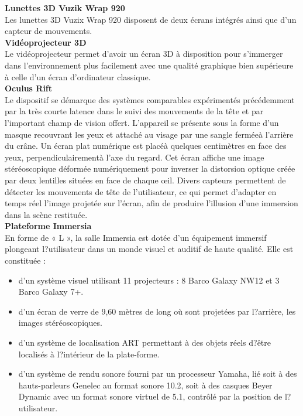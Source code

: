 \textbf{Lunettes 3D Vuzik Wrap 920}
\\

Les lunettes 3D Vuzix Wrap 920 disposent de deux écrans intégrés ainsi que d'un capteur de mouvements.
\\

\textbf{Vidéoprojecteur 3D}
\\

Le vidéoprojecteur permet d'avoir un écran 3D à disposition pour s'immerger dans l'environnement plus facilement avec une qualité graphique bien supérieure à celle d'un écran d'ordinateur classique.
\\


\textbf{Oculus Rift}
\\

Le dispositif se démarque des systèmes comparables expérimentés précédemment par la très courte latence dans le suivi des mouvements de la tête et par l'important champ de vision offert. L'appareil se présente sous la forme d'un masque recouvrant les yeux et attaché au visage par une sangle ferméeà l'arrière du crâne. Un écran plat numérique est placéà quelques centimètres en face des yeux, perpendiculairementà l'axe du regard. Cet écran affiche une image stéréoscopique déformée numériquement pour inverser la distorsion optique créée par deux lentilles situées en face de chaque œil. Divers capteurs permettent de détecter les mouvements de tête de l'utilisateur, ce qui permet d'adapter en temps réel l'image projetée sur l'écran, afin de produire l'illusion d'une immersion dans la scène restituée.
\\

\textbf{Plateforme Immersia}
\\

En forme de « L », la salle Immersia est dotée d'un équipement immersif plongeant l?utilisateur dans un monde visuel et auditif de haute qualité. 
Elle est constituée  :
\begin{itemize}
  \item d'un système visuel utilisant 11 projecteurs : 8 Barco Galaxy NW12 et 3 Barco Galaxy 7+.
  \item d'un écran de verre de 9,60 mètres de long où sont projetées par l?arrière, les images stéréoscopiques.
  \item d'un système de localisation ART permettant à des objets réels d?être localisés à l?intérieur de la plate-forme.
  \item d'un système de rendu sonore fourni par un processeur Yamaha, lié soit à des hauts-parleurs Genelec au format sonore 10.2, soit à des casques Beyer Dynamic avec un format sonore virtuel de 5.1, contrôlé par la position de l?utilisateur.
\end{itemize}

